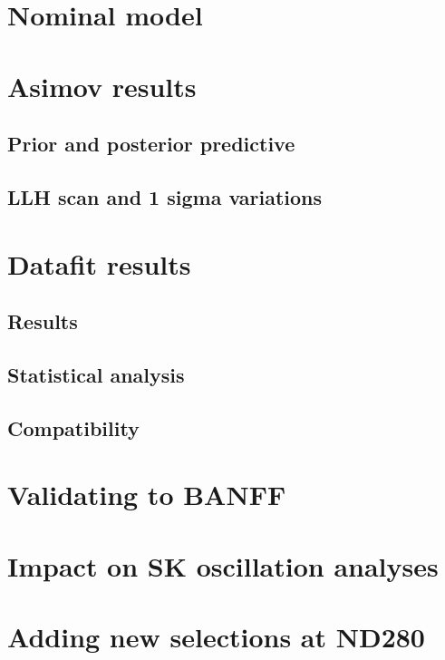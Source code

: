 \section{Nominal model}

\section{Asimov results}

\subsection{Prior and posterior predictive}

\subsection{LLH scan and 1 sigma variations}

\section{Datafit results}

\subsection{Results}

\subsection{Statistical analysis}

\subsection{Compatibility}

\section{Validating to BANFF}

\section{Impact on SK oscillation analyses}


\section{Adding new selections at ND280}